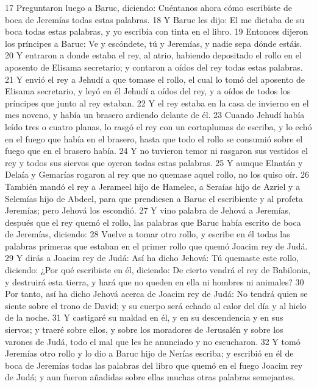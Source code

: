 17 Preguntaron luego a Baruc, diciendo: Cuéntanos ahora cómo escribiste de boca de Jeremías todas estas palabras.
18 Y Baruc les dijo: El me dictaba de su boca todas estas palabras, y yo escribía con tinta en el libro.
19 Entonces dijeron los príncipes a Baruc: Ve y escóndete, tú y Jeremías, y nadie sepa dónde estáis.
20 Y entraron a donde estaba el rey, al atrio, habiendo depositado el rollo en el aposento de Elisama secretario; y contaron a oídos del rey todas estas palabras.
21 Y envió el rey a Jehudí a que tomase el rollo, el cual lo tomó del aposento de Elisama secretario, y leyó en él Jehudí a oídos del rey, y a oídos de todos los príncipes que junto al rey estaban.
22 Y el rey estaba en la casa de invierno en el mes noveno, y había un brasero ardiendo delante de él.
23 Cuando Jehudí había leído tres o cuatro planas, lo rasgó el rey con un cortaplumas de escriba, y lo echó en el fuego que había en el brasero, hasta que todo el rollo se consumió sobre el fuego que en el brasero había.
24 Y no tuvieron temor ni rasgaron sus vestidos el rey y todos sus siervos que oyeron todas estas palabras.
25 Y aunque Elnatán y Delaía y Gemarías rogaron al rey que no quemase aquel rollo, no los quiso oír.
26 También mandó el rey a Jerameel hijo de Hamelec, a Seraías hijo de Azriel y a Selemías hijo de Abdeel, para que prendiesen a Baruc el escribiente y al profeta Jeremías; pero Jehová los escondió.
27 Y vino palabra de Jehová a Jeremías, después que el rey quemó el rollo, las palabras que Baruc había escrito de boca de Jeremías, diciendo:
28 Vuelve a tomar otro rollo, y escribe en él todas las palabras primeras que estaban en el primer rollo que quemó Joacim rey de Judá.
29 Y dirás a Joacim rey de Judá: Así ha dicho Jehová: Tú quemaste este rollo, diciendo: ¿Por qué escribiste en él, diciendo: De cierto vendrá el rey de Babilonia, y destruirá esta tierra, y hará que no queden en ella ni hombres ni animales?
30 Por tanto, así ha dicho Jehová acerca de Joacim rey de Judá: No tendrá quien se siente sobre el trono de David; y su cuerpo será echado al calor del día y al hielo de la noche.
31 Y castigaré su maldad en él, y en su descendencia y en sus siervos; y traeré sobre ellos, y sobre los moradores de Jerusalén y sobre los varones de Judá, todo el mal que les he anunciado y no escucharon.
32 Y tomó Jeremías otro rollo y lo dio a Baruc hijo de Nerías escriba; y escribió en él de boca de Jeremías todas las palabras del libro que quemó en el fuego Joacim rey de Judá; y aun fueron añadidas sobre ellas muchas otras palabras semejantes.

